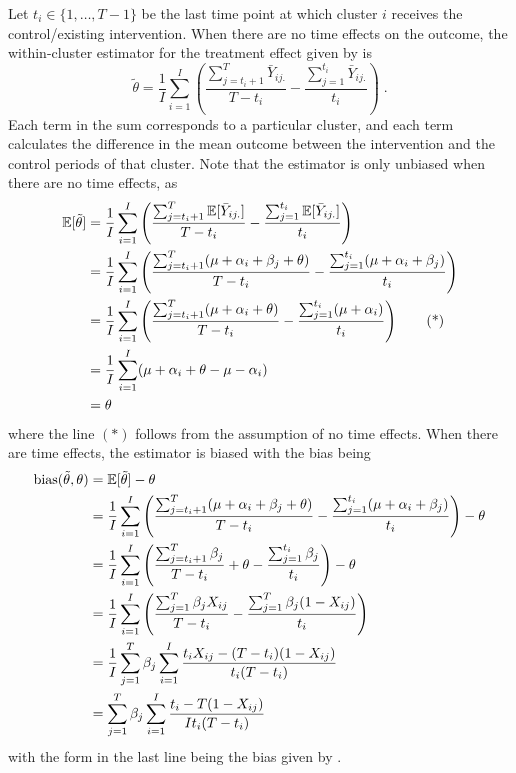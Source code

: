 \documentclass[10pt]{article}
\begin{document}
Let $t_i\in\{1,\ldots,T-1\}$ be the last time point at which cluster $i$ receives the control/existing intervention. When there are no time effects on the outcome, the within-cluster estimator for the treatment effect given by \textcite{Hussey:2007} is
\[
\tilde{\theta} = \frac{1}{I}\sum_{i=1}^I\left(\frac{\sum_{j=t_i+1}^T\bar{Y}_{ij.}}{T-t_i} - \frac{\sum_{j=1}^{t_i}\bar{Y}_{ij.}}{t_i}\right)\;.
\]
Each term in the sum corresponds to a particular cluster, and each term calculates the difference in the mean outcome between the intervention and the control periods of that cluster. Note that the estimator is only unbiased when there are no time effects, as
\begin{align*}
\mathbb{E}[\tilde{\theta}] &= \frac{1}{I}\sum_{i=1}^I\left(\frac{\sum_{j=t_i+1}^T\mathbb{E}[\bar{Y}_{ij.}]}{T-t_i} - \frac{\sum_{j=1}^{t_i}\mathbb{E}[\bar{Y}_{ij.}]}{t_i}\right) \\
&= \frac{1}{I}\sum_{i=1}^I\left(\frac{\sum_{j=t_i+1}^T(\mu+\alpha_i+\beta_j+\theta)}{T-t_i} - \frac{\sum_{j=1}^{t_i}(\mu+\alpha_i+\beta_j)}{t_i}\right) \\
&= \frac{1}{I}\sum_{i=1}^I\left(\frac{\sum_{j=t_i+1}^T(\mu+\alpha_i+\theta)}{T-t_i} - \frac{\sum_{j=1}^{t_i}(\mu+\alpha_i)}{t_i}\right) \tag{*} \\
&= \frac{1}{I}\sum_{i=1}^I(\mu+\alpha_i+\theta-\mu-\alpha_i) \\
&= \theta
\end{align*}
where the line $(*)$ follows from the assumption of no time effects. When there are time effects, the estimator is biased with the bias being
\begin{align*}
\mathrm{bias}(\tilde{\theta},\theta) &= \mathbb{E}[\tilde{\theta}] - \theta \\
&= \frac{1}{I}\sum_{i=1}^I\left(\frac{\sum_{j=t_i+1}^T(\mu+\alpha_i+\beta_j+\theta)}{T-t_i} - \frac{\sum_{j=1}^{t_i}(\mu+\alpha_i+\beta_j)}{t_i}\right) - \theta \\
&= \frac{1}{I}\sum_{i=1}^I\left(\frac{\sum_{j=t_i+1}^T\beta_j}{T-t_i} + \theta - \frac{\sum_{j=1}^{t_i}\beta_j}{t_i}\right) - \theta \\
&= \frac{1}{I}\sum_{i=1}^I\left(\frac{\sum_{j=1}^T\beta_jX_{ij}}{T-t_i} - \frac{\sum_{j=1}^T\beta_j(1-X_{ij})}{t_i}\right) \\
&= \frac{1}{I}\sum_{j=1}^T\beta_j\sum_{i=1}^I\frac{t_iX_{ij} - (T-t_i)(1-X_{ij})}{t_i(T-t_i)} \\
&= \sum_{j=1}^T\beta_j\sum_{i=1}^I\frac{t_i - T(1-X_{ij})}{It_i(T-t_i)}
\end{align*}
with the form in the last line being the bias given by \citeauthor{Hussey:2007}.
\end{document}
